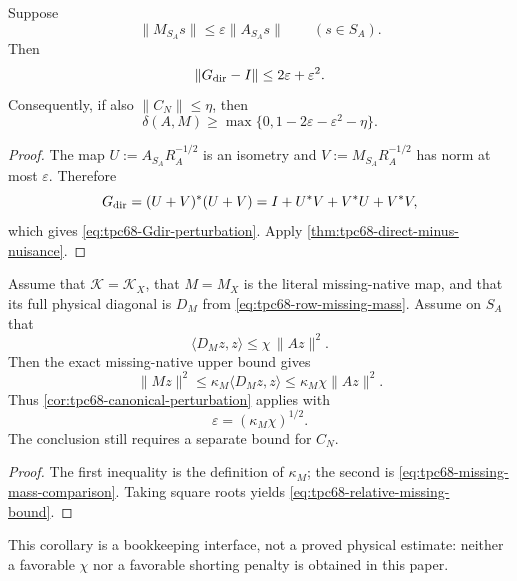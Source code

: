 \begin{corollary}
\label{cor:tpc68-canonical-perturbation}
Suppose
\begin{equation}
 \|M_{S_A}s\|\le\varepsilon\|A_{S_A}s\|
 \qquad(s\in S_A).
 \label{eq:tpc68-relative-missing-bound}
\end{equation}
Then
\begin{equation}
 \|G_{\rm dir}-I\|\le2\varepsilon+\varepsilon^2.
 \label{eq:tpc68-Gdir-perturbation}
\end{equation}
Consequently, if also \(\|C_N\|\le\eta\), then
\begin{equation}
 \delta(A,M)
 \ge
 \max\{0,1-2\varepsilon-\varepsilon^2-\eta\}.
 \label{eq:tpc68-safe-reassembly}
\end{equation}
\end{corollary}

\begin{proof}
The map \(U:=A_{S_A}R_A^{-1/2}\) is an isometry and
\(V:=M_{S_A}R_A^{-1/2}\) has norm at most \(\varepsilon\).  Therefore
\[
 G_{\rm dir}
 =(U+V)^*(U+V)
 =I+U^*V+V^*U+V^*V,
\]
which gives \eqref{eq:tpc68-Gdir-perturbation}.  Apply
\cref{thm:tpc68-direct-minus-nuisance}.
\end{proof}

\begin{corollary}
\label{cor:tpc68-missing-to-direct}
Assume that \(\mathcal K=\mathcal K_X\), that \(M=M_X\) is the literal
missing-native map, and that its full physical diagonal is \(D_M\) from
\eqref{eq:tpc68-row-missing-mass}.  Assume on \(S_A\) that
\begin{equation}
 \langle D_Mz,z\rangle\le\chi\,\|Az\|^2.
 \label{eq:tpc68-missing-mass-comparison}
\end{equation}
Then the exact missing-native upper bound gives
\[
 \|Mz\|^2\le\kappa_M\langle D_Mz,z\rangle
 \le\kappa_M\chi\|Az\|^2.
\]
Thus \cref{cor:tpc68-canonical-perturbation} applies with
\begin{equation}
 \varepsilon=(\kappa_M\chi)^{1/2}.
 \label{eq:tpc68-epsilon-kappa-chi}
\end{equation}
The conclusion still requires a separate bound for \(C_N\).
\end{corollary}

\begin{proof}
The first inequality is the definition of \(\kappa_M\); the second is
\eqref{eq:tpc68-missing-mass-comparison}.  Taking square roots yields
\eqref{eq:tpc68-relative-missing-bound}.
\end{proof}

This corollary is a bookkeeping interface, not a proved physical estimate:
neither a favorable \(\chi\) nor a favorable shorting penalty is obtained
in this paper.
